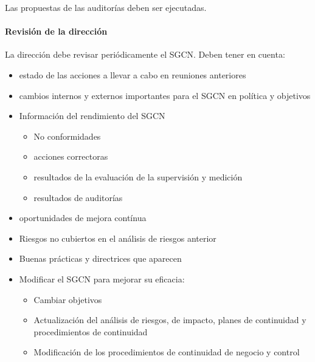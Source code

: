             Las propuestas de las auditorías deben ser ejecutadas.

        \paragraph{Revisión de la dirección}
            La dirección debe revisar periódicamente el SGCN. Deben tener en cuenta:
            \begin{itemize}
                \item estado de las acciones a llevar a cabo en reuniones anteriores
                \item cambios internos y externos importantes para el SGCN en política y objetivos
                \item Información del rendimiento del SGCN \begin{itemize}
                    \item No conformidades
                    \item acciones correctoras
                    \item resultados de la evaluación de la supervisión y medición
                    \item resultados de auditorías
                \end{itemize}
                \item oportunidades de mejora contínua
                \item Riesgos no cubiertos en el análisis de riesgos anterior
                \item Buenas prácticas y directrices que aparecen
                \item Modificar el SGCN para mejorar su eficacia: \begin{itemize}
                    \item Cambiar objetivos
                    \item Actualización del análisis de riesgos, de impacto, planes de continuidad y procedimientos de continuidad
                    \item Modificación de los procedimientos de continuidad de negocio y control
                \end{itemize}
            \end{itemize}

